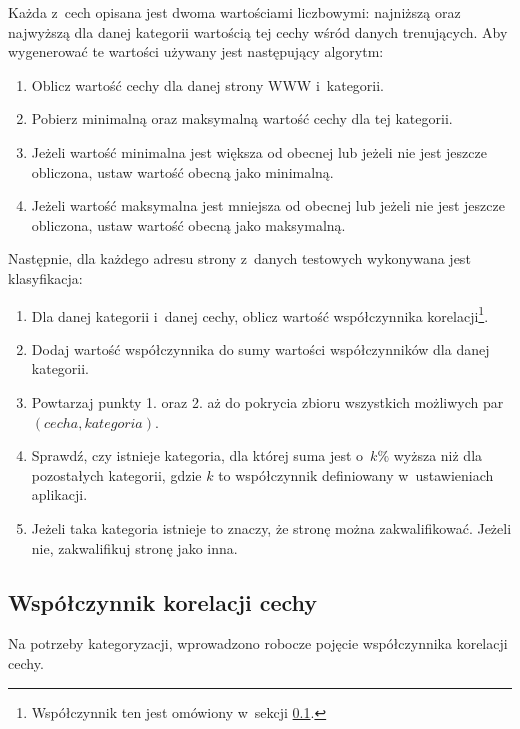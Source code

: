 \documentclass[a4paper,11pt]{article}
\begin{document}
Każda z~cech opisana jest dwoma wartościami liczbowymi: najniższą oraz najwyższą dla danej kategorii wartością tej cechy wśród danych trenujących. Aby wygenerować te wartości używany jest następujący algorytm:

\begin{enumerate}
    \item Oblicz wartość cechy dla danej strony WWW i~kategorii.
    \item Pobierz minimalną oraz maksymalną wartość cechy dla tej kategorii.
    \item Jeżeli wartość minimalna jest większa od obecnej lub jeżeli nie jest jeszcze obliczona, ustaw wartość obecną jako minimalną.
    \item Jeżeli wartość maksymalna jest mniejsza od obecnej lub jeżeli nie jest jeszcze obliczona, ustaw wartość obecną jako maksymalną.
\end{enumerate}

Następnie, dla każdego adresu strony z~danych testowych wykonywana jest klasyfikacja:

\begin{enumerate}
    \item Dla danej kategorii i~danej cechy, oblicz wartość współczynnika korelacji\footnote{Współczynnik ten jest omówiony w~sekcji \ref{sec:correlation_index}.}.
    \item Dodaj wartość współczynnika do sumy wartości współczynników dla danej kategorii.
    \item Powtarzaj punkty 1. oraz 2. aż do pokrycia zbioru wszystkich możliwych par $(cecha, kategoria)$.
    \item Sprawdź, czy istnieje kategoria, dla której suma jest o~$k \%$ wyższa niż dla pozostałych kategorii, gdzie $k$ to współczynnik definiowany w~ustawieniach aplikacji.
    \item Jeżeli taka kategoria istnieje to znaczy, że stronę można zakwalifikować. Jeżeli nie, zakwalifikuj stronę jako inna.
\end{enumerate}

\subsection{Współczynnik korelacji cechy}
\label{sec:correlation_index}

Na potrzeby kategoryzacji, wprowadzono robocze pojęcie współczynnika korelacji cechy.
\end{document}
